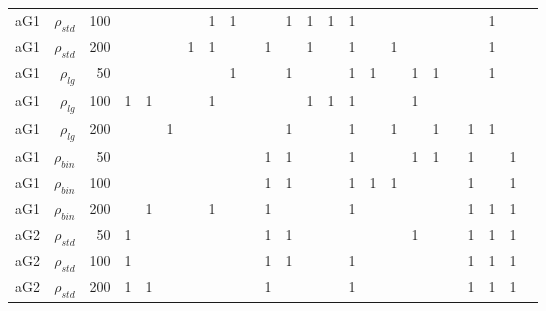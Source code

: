 \documentclass[twoside,11pt]{article}
\begin{document}
\begin{table}[htbp]
\begin{tabular}{rrr|rrrrrrrrrrrrrrrrrrrrr}
    aG1   & $\rho_{std}$ & 100   &       &       &       &       & 1     & 1     &       &       & 1     & 1     & 1     & 1     &       &       &       &       &       &       & 1     &       &  \\
    aG1   & $\rho_{std}$ & 200   &       &       &       & 1     & 1     &       &       & 1     &       & 1     &       & 1     &       & 1     &       &       &       &       & 1     &       &  \bigstrut[b]\\
    \hline
    aG1   & $\rho_{lg}$ & 50    &       &       &       &       &       & 1     &       &       & 1     &       &       & 1     & 1     &       & 1     & 1     &       &       & 1     &       &  \bigstrut[t]\\
    aG1   & $\rho_{lg}$ & 100   & 1     & 1     &       &       & 1     &       &       &       &       & 1     & 1     & 1     &       &       & 1     &       &       &       &       &       &  \\
    aG1   & $\rho_{lg}$ & 200   &       &       & 1     &       &       &       &       &       & 1     &       &       & 1     &       & 1     &       & 1     &       & 1     & 1     &       &  \bigstrut[b]\\
    \hline
    aG1   & $\rho_{bin}$ & 50    &       &       &       &       &       &       &       & 1     & 1     &       &       & 1     &       &       & 1     & 1     &       & 1     &       & 1     &  \bigstrut[t]\\
    aG1   & $\rho_{bin}$ & 100   &       &       &       &       &       &       &       & 1     & 1     &       &       & 1     & 1     & 1     &       &       &       & 1     &       & 1     &  \\
    aG1   & $\rho_{bin}$ & 200   &       & 1     &       &       & 1     &       &       & 1     &       &       &       & 1     &       &       &       &       &       & 1     & 1     & 1     &  \bigstrut[b]\\
    \hline
    aG2   & $\rho_{std}$ & 50    & 1     &       &       &       &       &       &       & 1     & 1     &       &       &       &       &       & 1     &       &       & 1     & 1     & 1     &  \bigstrut[t]\\
    aG2   & $\rho_{std}$ & 100   & 1     &       &       &       &       &       &       & 1     & 1     &       &       & 1     &       &       &       &       &       & 1     & 1     & 1     &  \\
    aG2   & $\rho_{std}$ & 200   & 1     & 1     &       &       &       &       &       & 1     &       &       &       & 1     &       &       &       &       &       & 1     & 1     & 1     &  \bigstrut[b]\\

\end{tabular}
\end{table}
\end{document}
